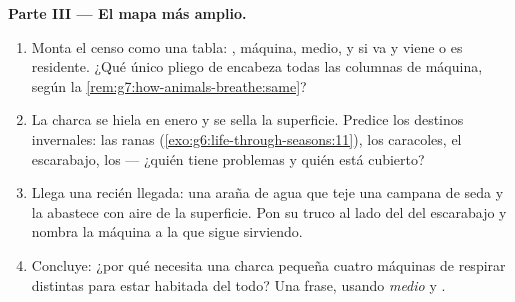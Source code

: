 \begin{problem}
\medskip\noindent\textbf{Parte III --- El mapa más amplio.}
\begin{enumerate}[resume]
  \item Monta el censo como una tabla: , máquina, medio, y si va
        y viene o es residente. ¿Qué único pliego de 
        encabeza todas las columnas de máquina, según la
        \cref{rem:g7:how-animals-breathe:same}?
  \item La charca se hiela en enero y se sella la superficie. Predice
        los destinos invernales: las ranas
        (\cref{exo:g6:life-through-seasons:11}), los caracoles, el
        escarabajo, los  --- ¿quién tiene problemas y quién está
        cubierto?
  \item Llega una recién llegada: una araña de agua que teje una
        campana de seda y la abastece con aire de la superficie. Pon su
        truco al lado del del escarabajo y nombra la máquina a la que
        sigue sirviendo.
  \item Concluye: ¿por qué necesita una charca pequeña cuatro máquinas
        de respirar distintas para estar habitada del todo? Una frase,
        usando \emph{medio} y \emph{}.
\end{enumerate}
\end{problem}
